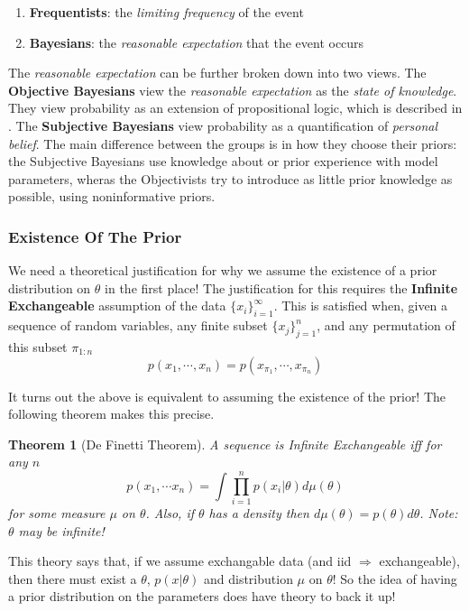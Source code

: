 \documentclass[]{article}
\theoremstyle{mattstyle}
\newtheorem{theorem}{Theorem}[section]
\theoremstyle{definition}
\begin{document}
\begin{enumerate}
	\item \textbf{Frequentists}: the \emph{limiting frequency} of the event
	\item \textbf{Bayesians}: the \emph{reasonable expectation} that the event occurs
\end{enumerate}

The \emph{reasonable expectation} can be further broken down into two views. The \textbf{Objective Bayesians} view the \emph{reasonable expectation} as the \emph{state of knowledge}. They view probability as an extension of propositional logic, which is described in \cite{jaynes}. The \textbf{Subjective Bayesians} view probability as a quantification of \emph{personal belief}. The main difference between the groups is in how they choose their priors: the Subjective Bayesians use knowledge about or prior experience with model parameters, wheras the Objectivists try to introduce as little prior knowledge as possible, using noninformative priors.

\subsubsection{Existence Of The Prior}
We need a theoretical justification for why we assume the existence of a prior distribution on \(\theta\) in the first place! The justification for this requires the \textbf{Infinite Exchangeable} assumption of the data \(\{x_i\}_{i=1}^{\infty}\). This is satisfied when, given a sequence of random variables, any finite subset \(\{x_j\}_{j=1}^{n}\), and any permutation of this subset \(\pi_{1:n}\) 
\begin{equation}
p(x_1, \cdots, x_n) = p(x_{\pi_1}, \cdots, x_{\pi_n})
\end{equation}

It turns out the above is equivalent to assuming the existence of the prior! The following theorem makes this precise.

\begin{theorem}[De Finetti Theorem]
	A sequence is Infinite Exchangeable iff for any \(n\)
	$$ p(x_1, \cdots x_n) = \int\prod_{i=1}^n p(x_i|\theta)d\mu(\theta) $$
	for some measure \(\mu\) on \(\theta\). Also, if $\theta$ has a density then $d\mu(\theta) = p(\theta)d\theta$. Note: \(\theta\) may be infinite!
\end{theorem}

This theory says that, if we assume exchangable data (and iid $\Rightarrow$ exchangeable), then there must exist a \(\theta\), \(p(x|\theta)\) and distribution \(\mu\) on \(\theta\)! So the idea of having a prior distribution on the parameters does have theory to back it up!
\end{document}
